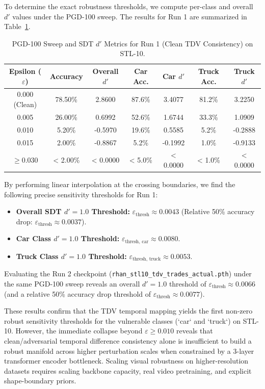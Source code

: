 \documentclass[12pt,a4paper]{article}
\begin{document}
To determine the exact robustness thresholds, we compute per-class and overall $d'$ values under the PGD-100 sweep. The results for Run 1 are summarized in Table~\ref{tab:tdv_clean_sweep}.

\begin{table}[h]
\centering
\caption{PGD-100 Sweep and SDT $d'$ Metrics for Run 1 (Clean TDV Consistency) on STL-10.}
\label{tab:tdv_clean_sweep}
\begin{tabular}{c|cc|cc|cc}
\hline
\textbf{Epsilon ($\varepsilon$)} & \textbf{Accuracy} & \textbf{Overall $d'$} & \textbf{Car Acc.} & \textbf{Car $d'$} & \textbf{Truck Acc.} & \textbf{Truck $d'$} \\ \hline
0.000 (Clean) & 78.50\% & 2.8600 & 87.6\% & 3.4077 & 81.2\% & 3.2250 \\
0.005         & 26.00\% & 0.6992 & 52.6\% & 1.6744 & 33.3\% & 1.0909 \\
0.010         & 5.20\%  & -0.5970 & 19.6\% & 0.5585 & 5.2\%  & -0.2888 \\
0.015         & 2.00\%  & -0.8867 & 5.2\%  & -0.1992 & 1.0\%  & -0.9133 \\
$\ge 0.030$   & < 2.00\%  & < 0.0000 & < 5.0\%  & < 0.0000 & < 1.0\%  & < 0.0000 \\ \hline
\end{tabular}
\end{table}

By performing linear interpolation at the crossing boundaries, we find the following precise sensitivity thresholds for Run 1:
\begin{itemize}
    \item \textbf{Overall SDT $d'=1.0$ Threshold:} $\varepsilon_{\text{thresh}} \approx 0.0043$ (Relative 50\% accuracy drop: $\varepsilon_{\text{thresh}} \approx 0.0037$).
    \item \textbf{Car Class $d'=1.0$ Threshold:} $\varepsilon_{\text{thresh, car}} \approx 0.0080$.
    \item \textbf{Truck Class $d'=1.0$ Threshold:} $\varepsilon_{\text{thresh, truck}} \approx 0.0053$.
\end{itemize}

Evaluating the Run 2 checkpoint (\texttt{rhan\_stl10\_tdv\_trades\_actual.pth}) under the same PGD-100 sweep reveals an overall $d'=1.0$ threshold of $\varepsilon_{\text{thresh}} \approx 0.0066$ (and a relative 50\% accuracy drop threshold of $\varepsilon_{\text{thresh}} \approx 0.0077$). 

These results confirm that the TDV temporal mapping yields the first non-zero robust sensitivity thresholds for the vulnerable classes (`car` and `truck`) on STL-10. However, the immediate collapse beyond $\varepsilon \ge 0.010$ reveals that clean/adversarial temporal difference consistency alone is insufficient to build a robust manifold across higher perturbation scales when constrained by a 3-layer transformer encoder bottleneck. Scaling visual robustness on higher-resolution datasets requires scaling backbone capacity, real video pretraining, and explicit shape-boundary priors.
\end{document}
